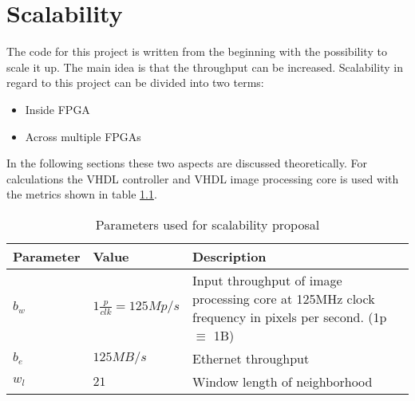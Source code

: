 %
%
\chapter{Scalability} \label{chapt:scalability}
The code for this project is written from the beginning with the possibility to
scale it up. The main idea is that the throughput can be increased.
Scalability in regard to this project can be divided into two terms:
\begin{itemize}
    \item Inside FPGA
    \item Across multiple FPGAs
\end{itemize}

In the following sections these two aspects are discussed theoretically. For
calculations the VHDL controller and VHDL image processing core is used with the
 metrics shown in table \ref{tab:sca:vhdlparams}.

\begin{table}[h!]
    \centering
    \begin{tabular}{l l p{10cm}}
        \toprule
        Parameter & Value & Description \\
        \midrule
        $b_w$  & $1 \frac{p}{clk} = 125 Mp/s$ & Input throughput of image
        processing core at 125MHz clock frequency in pixels per second. (1p
        $\equiv$ 1B) \\
        $b_e$  & $125MB/s$ & Ethernet throughput \\
        $w_l$  & $21$ & Window length of neighborhood \\
        \bottomrule
    \end{tabular}
    \caption{Parameters used for scalability proposal}
    \label{tab:sca:vhdlparams}
\end{table}

\clearpage

